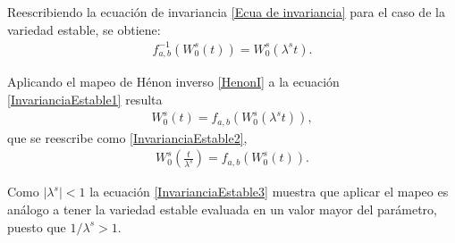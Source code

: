 \documentclass[11pt]{beamer}
\theoremstyle{definition}
\begin{document}
\begin{frame}
Reescribiendo la ecuación de invariancia \eqref{Ecua de invariancia} para el caso de la variedad estable, se obtiene:
\begin{eqnarray}
f_{a,b}^{-1}(W_{0}^{s}(t))=W_{0}^{s}(\lambda^{s}t).
\label{InvarianciaEstable1}
\end{eqnarray}

Aplicando el mapeo de Hénon inverso \eqref{HenonI} a la ecuación \eqref{InvarianciaEstable1} resulta
\begin{eqnarray}
W_{0}^{s}(t)=f_{a,b}(W_{0}^{s}(\lambda^{s}t)),
\label{InvarianciaEstable2}
\end{eqnarray}
que se reescribe como \eqref{InvarianciaEstable2}, 
\begin{eqnarray}
W_{0}^{s}\left(\frac{t}{\lambda^{s}}\right)=f_{a,b}(W_{0}^{s}(t)).
\label{InvarianciaEstable3}
\end{eqnarray}

Como $\vert \lambda^{s} \vert < 1 $ la ecuación \eqref{InvarianciaEstable3} muestra que aplicar el mapeo es análogo a tener la variedad estable evaluada en un valor mayor del parámetro, puesto que $1/\lambda^{s}>1$. 
\end{frame}
\end{document}
